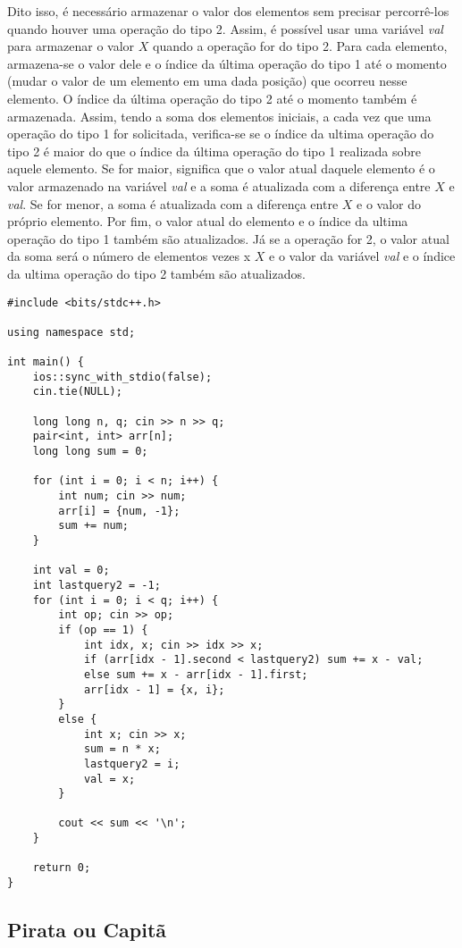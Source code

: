 \documentclass[11pt,fancychapters]{article}
\begin{document}
Dito isso, é necessário armazenar o valor dos elementos sem precisar percorrê-los quando houver uma operação do tipo 2. Assim, é possível usar uma variável \emph{val} para armazenar o valor $X$ quando a operação for do tipo 2. Para cada elemento, armazena-se o valor dele e o índice da última operação do tipo 1 até o momento (mudar o valor de um elemento em uma dada posição) que ocorreu nesse elemento. O índice da última operação do tipo 2 até o momento também é armazenada. Assim, tendo a soma dos elementos iniciais, a cada vez que uma operação do tipo 1 for solicitada, verifica-se se o índice da ultima operação do tipo 2 é maior do que o índice da última operação do tipo 1 realizada sobre aquele elemento. Se for maior, significa que o valor atual daquele elemento é o valor armazenado na variável \emph{val} e a soma é atualizada com a diferença entre $X$ e \emph{val}. Se for menor, a soma é atualizada com a diferença entre $X$ e o valor do próprio elemento. Por fim, o valor atual do elemento e o índice da ultima operação do tipo 1 também são atualizados. Já se a operação for 2, o valor atual da soma será o número de elementos vezes x $X$ e o valor da variável \emph{val} e o índice da ultima operação do tipo 2 também são atualizados.\\
\newpage
\begin{lstlisting}[style=c++]
#include <bits/stdc++.h>

using namespace std;

int main() {
    ios::sync_with_stdio(false);
    cin.tie(NULL);
    
    long long n, q; cin >> n >> q;
    pair<int, int> arr[n];
    long long sum = 0;
    
    for (int i = 0; i < n; i++) {
        int num; cin >> num;
        arr[i] = {num, -1};
        sum += num;
    }
    
    int val = 0;
    int lastquery2 = -1;
    for (int i = 0; i < q; i++) {
        int op; cin >> op;
        if (op == 1) {
            int idx, x; cin >> idx >> x;
            if (arr[idx - 1].second < lastquery2) sum += x - val;
            else sum += x - arr[idx - 1].first;
            arr[idx - 1] = {x, i};
        }
        else {
            int x; cin >> x;
            sum = n * x;
            lastquery2 = i;
            val = x;
        }
        
        cout << sum << '\n';
    }

    return 0;
}
\end{lstlisting}
\newpage
\begin{center}\section{Pirata ou Capitã}\end{center}
\end{document}
